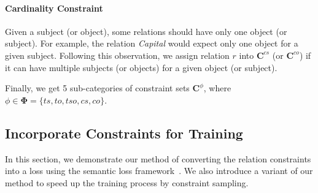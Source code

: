 
\paragraph{Cardinality Constraint}
Given a subject (or object), some relations should have only one object (or subject).
For example, the relation \emph{Capital} would expect only one object for a given subject.
Following this observation, we assign relation $r$ into $\bm{C}^{cs}$ (or $\bm{C}^{co}$) if it can have multiple subjects (or objects) for a given object (or subject).



Finally, we get 5 sub-categories of constraint sets $\bm{C}^{\phi}$, where $\phi \in\bm{\Phi}=\{ts, to, tso, cs, co\}$.

\subsection{Incorporate  Constraints for Training}
\label{sec:loss_term}
In this section, we demonstrate our method of converting the relation constraints into a loss using the semantic loss framework~\cite{xu2017semantic}.
We also introduce a variant of our method to speed up the training process by constraint sampling.

